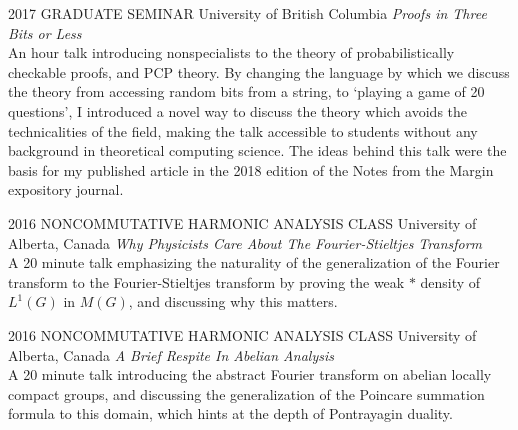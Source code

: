 \documentclass{friggeri-cv}
\begin{document}
\begin{entrylist}


\entry
{2017}
{GRADUATE SEMINAR}
{University of British Columbia}
{\emph{Proofs in Three Bits or Less}\\
An hour talk introducing nonspecialists to the theory of probabilistically checkable proofs, and PCP theory. By changing the language by which we discuss the theory from accessing random bits from a string, to `playing a game of 20 questions', I introduced a novel way to discuss the theory which avoids the technicalities of the field, making the talk accessible to students without any background in theoretical computing science. The ideas behind this talk were the basis for my published article in the 2018 edition of the Notes from the Margin expository journal.}


\entry
{2016}
{NONCOMMUTATIVE HARMONIC ANALYSIS CLASS}
{University of Alberta, Canada}
{\emph{Why Physicists Care About The Fourier-Stieltjes Transform}\\
A 20 minute talk emphasizing the naturality of the generalization of the Fourier transform to the Fourier-Stieltjes transform by proving the weak $*$ density of $L^1(G)$ in $M(G)$, and discussing why this matters.}

\entry
{2016}
{NONCOMMUTATIVE HARMONIC ANALYSIS CLASS}
{University of Alberta, Canada}
{\emph{A Brief Respite In Abelian Analysis}\\
A 20 minute talk introducing the abstract Fourier transform on abelian locally compact groups, and discussing the generalization of the Poincare summation formula to this domain, which hints at the depth of Pontrayagin duality.}

\end{entrylist}
\end{document}
